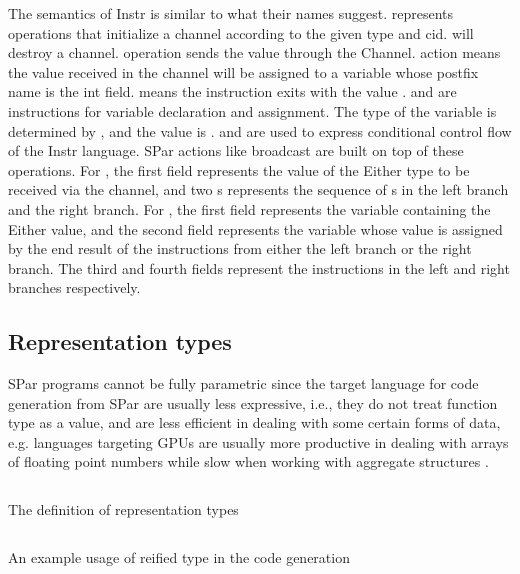 The semantics of Instr is similar to what their names suggest.  represents operations that initialize a channel according to the given type and cid.  will destroy a channel.  operation sends the value  through the Channel.  action means the value received in the channel will be assigned to a variable whose postfix name is the int field.  means the instruction exits with the value .  and  are instructions for variable declaration and assignment. The type of the variable is determined by , and the value is .  and  are used to express conditional control flow of the Instr language. SPar actions like broadcast are built on top of these operations. For , the first field represents the value of the Either type to be received via the channel, and two s represents the sequence of s in the left branch and the right branch. For , the first field represents the variable containing the Either value, and the second field represents the variable whose value is assigned by the end result of the instructions from either the left branch or the right branch. The third and fourth fields represent the instructions in the left and right branches respectively.

\subsection{Representation types} \label{codegen:sec:repr}
SPar programs cannot be fully parametric since the target language for code generation from SPar are usually less expressive, i.e., they do not treat function type  as a value, and are less efficient in dealing with some certain forms of data, e.g. languages targeting GPUs are usually more productive in dealing with arrays of floating point numbers while slow when working with aggregate structures \cite{mcdonellTypesafeRuntimeCode}. 
\begin{listing}
    \inputminted{Haskell}{codegen/repr.hs}    
    \caption{The definition of representation types}
    \label{codegen:code:repr}
\end{listing}
\begin{listing}
    \inputminted{Haskell}{codegen/const.hs} 
    \caption{An example usage of reified type in the code generation}
    \label{codegen:code:const}
\end{listing}

